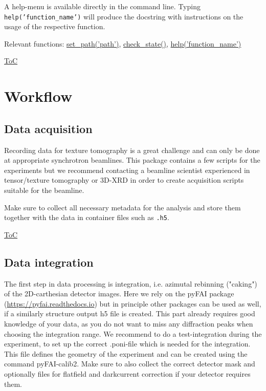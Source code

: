 A help-menu is available directly in the command line. Typing \texttt{help('function\_name')} will
produce the docstring with instructions on the usage of the respective function.

Relevant functions:
\hyperref[fun:setpath]{set\_path('path')},
\hyperref[fun:checkstate]{check\_state()},
\hyperref[fun:help]{help('function\_name')}

\begin{flushright}
    \hyperref[toc]{ToC}
\end{flushright}

\newpage
\section{Workflow}

\subsection{Data acquisition}
Recording data for texture tomography is a great challenge and can only be done at appropriate synchrotron beamlines.
This package contains a few scripts for the experiments but we recommend contacting 
a beamline scientist experienced in tensor/texture tomography or 
3D-XRD in order to create acquisition scripts suitable for the beamline.

Make sure to collect all necessary metadata for the analysis and store them together with the data in
container files such as \texttt{.h5}.

\begin{flushright}
    \hyperref[toc]{ToC}
\end{flushright}

\subsection{Data integration}\label{sec:integration}
The first step in data processing is integration, i.e. azimutal rebinning ("caking") of the 2D-carthesian detector images.
Here we rely on the pyFAI package (\url{https://pyfai.readthedocs.io}) but in principle other packages can be used as well,
if a similarly structure output h5 file is created.
This part already requires good knowledge of your data, as you do not want to miss any diffraction peaks when choosing the
integration range. We recommend to do a test-integration during the experiment, to set up the correct
.poni-file which is needed for the integration. This file defines the geometry of the experiment and can be
created using the command pyFAI-calib2. Make sure to also collect the correct detector mask and optionally files
for flatfield and darkcurrent correction if your detector requires them.

